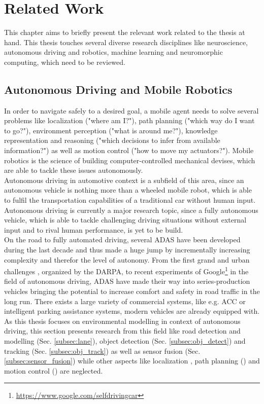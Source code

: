 \chapter{Related Work}
This chapter aims to briefly present the relevant work related to the thesis at hand.
This thesis touches several diverse research disciplines like neuroscience, autonomous driving and robotics, machine learning and neuromorphic computing, which need to be reviewed.

\section{Autonomous Driving and Mobile Robotics}
In order to navigate safely to a desired goal, a mobile agent needs to solve several problems like localization ("where am I?"), path planning ("which way do I want to go?"), environment perception ("what is around me?"), knowledge representation and reasoning ("which decisions to infer from available information?") as well as motion control ("how to move my actuators?").
Mobile robotics is the science of building computer-controlled mechanical devises, which are able to tackle these issues autonomously.\\
Autonomous driving in automotive context is a subfield of this area, since an autonomous vehicle is nothing more than a wheeled mobile robot, which is able to fulfil the transportation capabilities of a traditional car without human input. 
Autonomous driving is currently a major research topic, since a fully autonomous vehicle, which is able to tackle challenging driving situations without external input and to rival human performance, is yet to be build.\\
On the road to fully automated driving, several \ac{ADAS} have been developed during the last decade and thus made a huge jump by incrementally increasing complexity and therefor the level of autonomy. 
From the first grand \cite{Thrun2006} and urban challenges \cite{Urmson.2008}, organized by the \ac{DARPA}, to recent experiments of Google\footnote{\url{https://www.google.com/selfdrivingcar}} in the field of autonomous driving, \ac{ADAS} have made their way into series-production vehicles bringing the potential to increase comfort and safety in road traffic in the long run. 
There exists a large variety of commercial systems, like e.g. \ac{ACC} or intelligent parking assistance systems, modern vehicles are already equipped with.\\
As this thesis focuses on environmental modelling in context of autonomous driving, this section presents research from this field like road detection and modelling (Sec. \ref{subsec:lane}), object detection (Sec. \ref{subsec:obj_detect}) and tracking (Sec. \ref{subsec:obj_track}) as well as sensor fusion (Sec. \ref{subsec:sensor_fusion}) while other aspects like localization \cite{Levinson2010, Thrun2005}, path planning () and motion control () are neglected.
